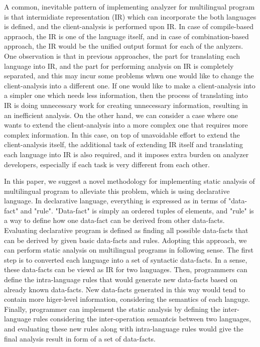 A common, inevitable pattern of implementing analyzer for multilingual program
is that intermidiate representation (IR) which can incorporate the both
languages is defined, and the client-analysis is performed upon IR. In case of
compile-based appraoch, the IR is one of the language itself, and in case of
combination-based approach, the IR would be the unified output format for each
of the anlyzers. One observation is that in previous approaches, the part for
translating each language into IR, and the part for performing analysis on IR
is completely separated, and this may incur some problems whwn one would like
to change the client-analysis into a different one. If one would like to make a
client-analysis into a simpler one which needs less information, then the
process of translating into IR is doing unnecessary work for creating
unnecessary information, resulting in an inefficient analysis. On the other
hand, we can consider a case where one wants to extend the client-analysis into
a more complex one that requires more complex information. In this case, on top
of unavoidable effort to extend the client-analysis itself, the additional task
of extending IR itself and translating each language into IR is also required,
and it imposes extra burden on analyzer developers, especially if each task is
very different from each other.

In this paper, we suggest a novel methodology for implementing static analysis
of multilingual program to alleviate this problem, which is using declarative
language.  In declarative language, everything is expressed as in terms of
"data-fact" and "rule".  "Data-fact" is simply an ordered tuples of elements,
and "rule" is a way to define how one data-fact can be derived from other
data-facts. Evaluating declarative program is defined as finding all possible
data-facts that can be derived by given basic data-facts and rules.  Adopting
this approach, we can perform static analysis on multilingual programs in
following sense.  The first step is to converted each language into a set of
syntactic data-facts. In a sense, these data-facts can be viewd as IR for two
languages.  Then, programmers can define the intra-language rules that would
generate new data-facts based on already known data-facts. New data-facts
generated in this way would tend to contain more higer-level information,
considering the semantics of each languge. Finally, programmer can implement
the static analysis by defining the inter-language rules considering the
inter-operation semantcis between two languages, and evaluating these new rules
along with intra-language rules would give the final analysis result in form of
a set of data-facts.

